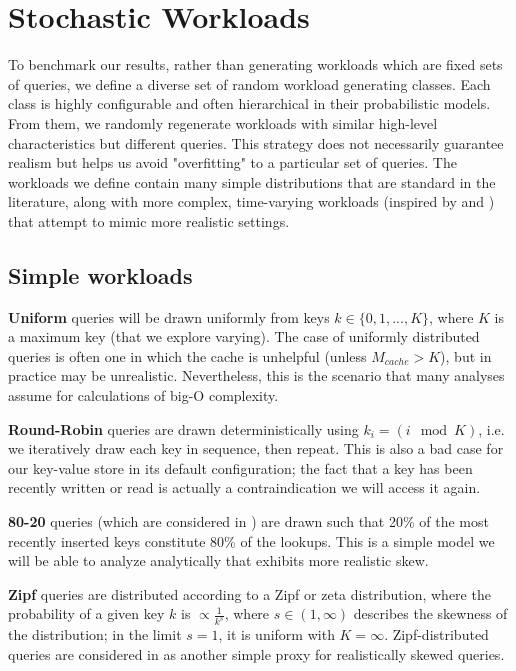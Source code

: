 \documentclass{sig-alternate-05-2015}
\begin{document}
\section{Stochastic Workloads}

To benchmark our results, rather than generating workloads which are fixed sets
of queries, we define a diverse set of random workload generating classes.
Each class is highly configurable and often hierarchical in their probabilistic
models.  From them, we randomly regenerate workloads with similar high-level
characteristics but different queries. This strategy does not necessarily
guarantee realism but helps us avoid "overfitting" to a particular set of
queries. The workloads we define contain many simple distributions that are
standard in the literature, along with more complex, time-varying workloads
(inspired by \cite{characterizing-memcached} and \cite{linkbench}) that attempt
to mimic more realistic settings.

\subsection{Simple workloads}

\textbf{Uniform} queries will be drawn uniformly from keys $k \in
\{0,1,...,K\}$, where $K$ is a maximum key (that we explore varying).
The case of uniformly distributed queries is often one in
which the cache is unhelpful (unless $M_{cache} > K$), but in practice may be
unrealistic. Nevertheless, this is the scenario that many analyses assume for
calculations of big-O complexity.

\textbf{Round-Robin} queries are drawn deterministically using $k_i = (i \mod
K)$, i.e. we iteratively draw each key in sequence, then repeat.
This is also a bad case for our key-value store in its default configuration;
the fact that a key has been recently written or read is actually a
contraindication we will access it again.

\textbf{80-20} queries (which are considered in \cite{monkey}) are drawn such
that 20\% of the most recently inserted keys constitute 80\% of the lookups.
This is a simple model we will be able to analyze analytically that exhibits
more realistic skew.

\textbf{Zipf} queries are distributed according to a Zipf or zeta distribution,
where the probability of a given key $k$ is $\propto \frac{1}{k^s}$, where $s
\in (1, \infty)$ describes the skewness of the distribution; in the limit
$s=1$, it is uniform with $K=\infty$. Zipf-distributed queries are considered
in \cite{art} as another simple proxy for realistically skewed queries.
\end{document}
